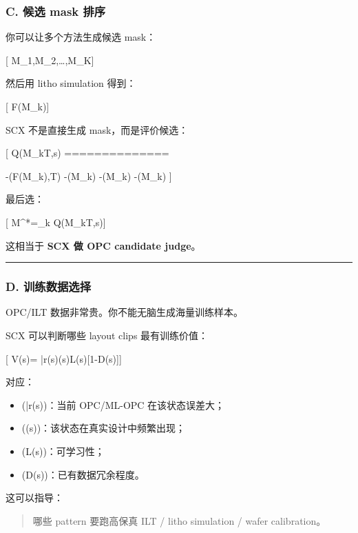 \documentclass[
  12pt,
]{ctexart}
\providecommand{\tightlist}{%
  \setlength{\itemsep}{0pt}\setlength{\parskip}{0pt}}
\begin{document}
\subsubsection{C. 候选 mask
排序}\label{c.-ux5019ux9009-mask-ux6392ux5e8f}

你可以让多个方法生成候选 mask：

{[} M\_1,M\_2,\dots,M\_K{]}

然后用 litho simulation 得到：

{[} F(M\_k){]}

SCX 不是直接生成 mask，而是评价候选：

{[} Q(M\_k\mid T,s) ==============

-(F(M\_k),T) -\alpha {}(M\_k)
-\beta {}(M\_k) -\gamma {}(M\_k)
{]}

最后选：

{[} M\^{}*=\arg\max\_k Q(M\_k\mid T,s){]}

这相当于 \textbf{SCX 做 OPC candidate judge}。

\begin{center}\rule{0.5\linewidth}{0.5pt}\end{center}

\subsubsection{D.
训练数据选择}\label{d.-ux8badux7ec3ux6570ux636eux9009ux62e9}

OPC/ILT 数据非常贵。你不能无脑生成海量训练样本。

SCX 可以判断哪些 layout clips 最有训练价值：

{[} V(s)= \bar r(s)\rho(s)L(s){[}1-D(s){]}{]}

对应：

\begin{itemize}
\tightlist
\item
  (\bar r(s))：当前 OPC/ML-OPC 在该状态误差大；
\item
  (\rho(s))：该状态在真实设计中频繁出现；
\item
  (L(s))：可学习性；
\item
  (D(s))：已有数据冗余程度。
\end{itemize}

这可以指导：

\begin{quote}
哪些 pattern 要跑高保真 ILT / litho simulation / wafer calibration。
\end{quote}
\end{document}
